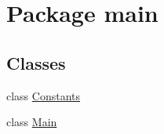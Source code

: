 \hypertarget{namespacemain}{}\section{Package main}
\label{namespacemain}
\subsection*{Classes}
\begin{DoxyCompactItemize}
\item 
class \hyperlink{classmain_1_1_constants}{Constants}
\item 
class \hyperlink{classmain_1_1_main}{Main}
\end{DoxyCompactItemize}

